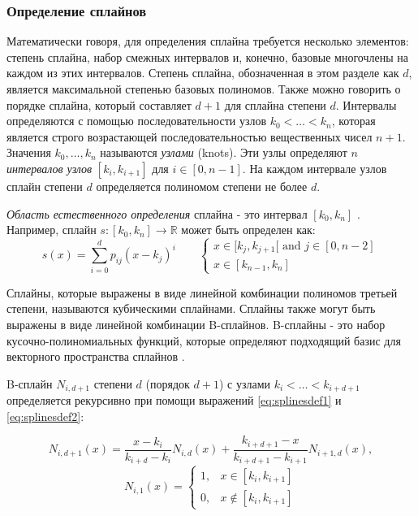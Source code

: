 \subsubsection{Определение сплайнов}
Математически говоря, для определения сплайна требуется несколько элементов: степень сплайна, набор смежных интервалов и, конечно, базовые многочлены на каждом из этих интервалов.
Степень сплайна, обозначенная в этом разделе как $ d $, является максимальной степенью базовых полиномов.
Также можно говорить о порядке сплайна, который составляет $ d + 1 $ для сплайна степени $ d $.
Интервалы определяются с помощью последовательности узлов $ k_0 <\ldots <k_n $, которая является строго возрастающей последовательностью вещественных чисел $ n + 1 $.
Значения $ k_0, \ldots, k_n $ называются \emph{узлами} (knots).
Эти узлы определяют $ n $ \emph{интервалов узлов} $ [k_i, k_ {i + 1}] $ для $ i \in [0, n-1] $.
На каждом интервале узлов сплайн степени $ d $ определяется полиномом степени не более $ d $.

\emph{Область естественного определения} сплайна - это интервал $ [k_0, k_n] $ \cite{Splines}.
Например, сплайн $s: [k_0, k_n] \rightarrow \mathbb {R} $ может быть определен как:
\begin{equation}
    s(x) =
    \sum_{i=0}^d p_{ij} (x - k_j)^i \qquad
    \begin{cases}
        x \in [k_j,k_{j+1}[ \textrm{ and } j \in [ 0,n-2 ] \\
        x \in [k_{n-1},k_n]
    \end{cases}
    \end{equation}

Сплайны, которые выражены в виде линейной комбинации полиномов третьей степени, называются кубическими сплайнами.
Сплайны также могут быть выражены в виде линейной комбинации B-сплайнов.
B-сплайны - это набор кусочно-полиномиальных функций, которые определяют подходящий базис для векторного пространства сплайнов \cite{Splines}.

B-сплайн $N_{i, d + 1} $ степени $ d $ (порядок $ d + 1 $) с узлами $ k_i < \ldots <k_ {i + d + 1} $ определяется рекурсивно при помощи выражений \ref{eq:splinesdef1} и \ref{eq:splinesdef2}:

\begin{equation} \label{eq:splinesdef1}
    N_{i,d+1}(x) = \frac{x - k_i}{k_{i+d} - k_i} N_{i,d}(x) + \frac{k_{i+d+1} - x}{k_{i+d+1} - k_{i+1}} N_{i+1,d}(x),
    \end{equation}
    \begin{equation} \label{eq:splinesdef2}
    N_{i,1}(x)= 
    \begin{cases} 
    1, & x \in [k_i,k_{i+1}] \\ 
    0, & x \notin [k_i,k_{i+1}]
    \end{cases}
    \end{equation}


